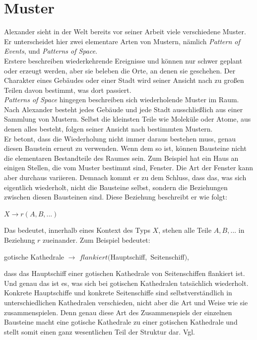 \documentclass[fontsize=11pt,a4paper,final]{scrreprt}[2003/01/01]
\begin{document}
\section{Muster}
Alexander sieht in der Welt bereits vor seiner Arbeit viele verschiedene Muster. Er unterscheidet hier zwei elementare Arten von Mustern, nämlich \textit{Pattern of Events}, und \textit{Patterns of Space}. \\
Erstere beschreiben wiederkehrende Ereignisse und können nur schwer geplant oder erzeugt werden, aber sie beleben die Orte, an denen sie geschehen. Der Charakter eines Gebäudes oder einer Stadt wird seiner Ansicht nach zu großen Teilen davon bestimmt, was dort passiert.  \\
\textit{Patterns of Space} hingegen beschreiben sich wiederholende Muster im Raum. Nach Alexander besteht jedes Gebäude und jede Stadt ausschließlich aus einer Sammlung von Mustern. Selbst die kleinsten Teile wie Moleküle oder Atome, aus denen alles besteht, folgen seiner Ansicht nach bestimmten Mustern. \\ 
Er betont, dass die Wiederholung nicht immer daraus bestehen muss, genau diesen Baustein erneut zu verwenden. Wenn dem so ist, können Bausteine nicht die elementaren Bestandteile des Raumes sein. Zum Beispiel hat ein Haus an einigen Stellen, die vom Muster bestimmt sind, Fenster. Die Art der Fenster kann aber durchaus variieren. Demnach kommt er zu dem Schluss, dass das, was sich eigentlich wiederholt, nicht die Bausteine selbst, sondern die Beziehungen zwischen diesen Bausteinen sind. Diese Beziehung beschreibt er wie folgt:
\begin{center}
	$ X \rightarrow r(A, B, ...) $
\end{center}
Das bedeutet, innerhalb eines Kontext des Typs $X$, stehen alle Teile $A, B, ...$ in Beziehung $r$ zueinander. Zum Beispiel bedeutet:
\begin{center}
	gotische Kathedrale $\rightarrow$ $flankiert($Hauptschiff$,$ Seitenschiff$)$,
\end{center}
dass das Hauptschiff einer gotischen Kathedrale von Seitenschiffen flankiert ist. Und genau das ist es, was sich bei gotischen Kathedralen tatsächlich wiederholt. Konkrete Hauptschiffe und konkrete Seitenschiffe sind selbstverständlich in unterschiedlichen Kathedralen verschieden, nicht aber die Art und Weise wie sie zusammenspielen. Denn genau diese Art des Zusammenspiels der einzelnen Bausteine macht eine gotische Kathedrale zu einer gotischen Kathedrale und stellt somit einen ganz wesentlichen Teil der Struktur dar. Vgl. \cite[S. 55 - 122]{Alexander1979}
\end{document}
